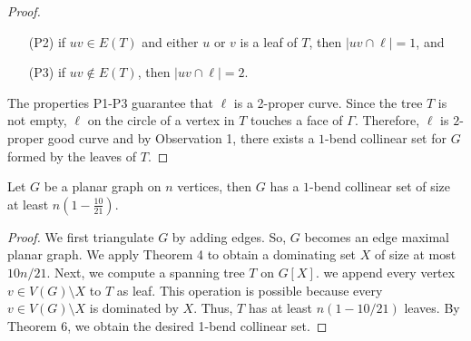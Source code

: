 \begin{proof}
\begin{enumerate}
        \item [(P2)] if $uv \in E(T)$ and either $u$ or $v$ is a leaf of $T$, then $|uv \cap \ell| = 1$, and

        \item [(P3)] if $uv \notin E(T)$, then $|uv \cap \ell| = 2$.
    \end{enumerate}

    The properties P1-P3 guarantee that $\ell$ is a 2-proper curve. Since the tree $T$ is not empty, $\ell$ on the circle of a vertex in $T$ touches a face of $\Gamma$. Therefore, $\ell$ is $2$-proper good curve and by Observation 1, there exists a $1$-bend collinear set for $G$ formed by the leaves of $T$.


\end{proof}


\begin{thm}
    Let $G$ be a planar graph on $n$ vertices, then $G$ has a $1$-bend collinear set of size at least $n(1 - \frac{10}{21})$.
\end{thm}

\begin{proof}
We first triangulate $G$ by adding edges. So, $G$ becomes an edge maximal planar graph. We apply Theorem 4 to obtain a dominating set $X$ of size at most $10n/21$. Next, we compute a spanning tree $T$ on $G[X]$. we append every vertex $v \in V(G)\setminus X$ to $T$ as leaf. This operation is possible because every $v \in V(G) \setminus X$ is dominated by $X$. Thus, $T$ has at least $n(1 - 10/21)$ leaves. By Theorem 6, we obtain the desired 1-bend collinear set.
\end{proof}
